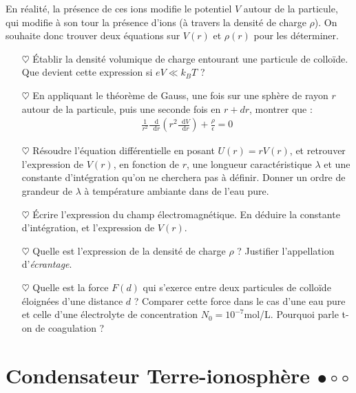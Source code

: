 \documentclass{report}
\newcommand*\dif{\mathop{}\!\mathrm{d}}
\begin{document}
En réalité, la présence de ces ions modifie le potentiel $V$ autour de la particule, qui modifie à son tour la présence d'ions (à travers la densité de charge $\rho$). On souhaite donc trouver deux équations sur $V(r)$ et $\rho(r)$ pour les déterminer. 

\begin{itemize}

	\item[$\heartsuit$] Établir la densité volumique de charge entourant une particule de colloïde. Que devient cette expression si $eV\ll k_BT$ ?
	
	\item[$\heartsuit$] En appliquant le théorème de Gauss, une fois sur une sphère de rayon $r$ autour de la particule, puis une seconde fois en $r+dr$, montrer que : 
	\begin{align*}
		\frac{1}{r^2}\frac{\dif}{\dif r}\left( r^2\frac{\dif V}{\dif r}\right) +\frac{\rho}{\epsilon}=0
	\end{align*}

	\item[$\heartsuit$] Résoudre l'équation différentielle en posant $U(r)=rV(r)$, et retrouver l'expression de $V(r)$, en fonction de $r$, une longueur caractéristique $\lambda$ et une constante d'intégration qu'on ne cherchera pas à définir. Donner un ordre de grandeur de $\lambda$ à température ambiante dans de l'eau pure.
	
	\item[$\heartsuit$] Écrire l'expression du champ électromagnétique. En déduire la constante d'intégration, et l'expression de $V(r)$. 
	
	\item[$\heartsuit$] Quelle est l'expression de la densité de charge $\rho$ ? Justifier l'appellation d'\textit{écrantage}.
	
	\item[$\heartsuit$] Quelle est la force $F(d)$ qui s'exerce entre deux particules de colloïde éloignées d'une distance $d$ ? Comparer cette force dans le cas d'une eau pure et celle d'une électrolyte de concentration $N_0=10^{-7}$mol/L. Pourquoi parle t-on de coagulation ?

\end{itemize} 

\newpage

\section*{Condensateur Terre-ionosphère $\bullet\circ\circ$}
\end{document}
